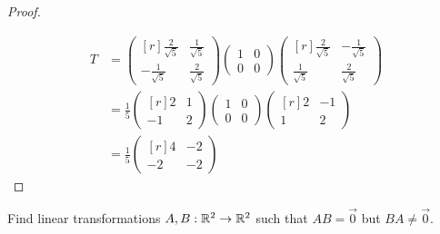 \begin{proof}
{\begin{center}
  \end{center}
  }
  \begin{align*}
    T&=
    \begin{pmatrix*}[r]
      \frac{2}{\sqrt{5}}  &\frac{1}{\sqrt{5}}\\[0.3cm]
      -\frac{1}{\sqrt{5}} &\frac{2}{\sqrt{5}}
    \end{pmatrix*}
    \begin{pmatrix} 1&0\\0&0 \end{pmatrix}
    \begin{pmatrix*}[r]
      \frac{2}{\sqrt{5}}  &-\frac{1}{\sqrt{5}}\\[0.3cm]
      \frac{1}{\sqrt{5}}  &\frac{2}{\sqrt{5}}
    \end{pmatrix*}\\[0.3cm]
    &=
    \frac{1}{5}
    \begin{pmatrix*}[r] 2 &1\\-1&2 \end{pmatrix*}
    \begin{pmatrix} 1&0\\0&0 \end{pmatrix}
    \begin{pmatrix*}[r] 2 &-1\\1&2 \end{pmatrix*}\\[0.3cm]
    &=
    \frac{1}{5}
    \begin{pmatrix*}[r]
      4&-2\\-2&-2
    \end{pmatrix*}
  \end{align*}
\end{proof}
\begin{exercise}
  Find linear transformations $A,B:\mathbb{R}^2\to\mathbb{R}^2$ such that 
  $AB=\vec{0}$ but $BA\neq \vec{0}$.
\end{exercise}
